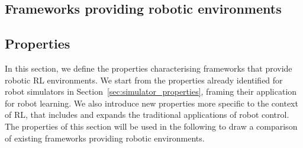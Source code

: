 \begin{addmargin}{-2mm}
\newpage
\section{Frameworks providing robotic environments}

\vspace*{-0.3mm}
\subsection{Properties}

In this section, we define the properties characterising frameworks that provide robotic \ac{RL} environments.
We start from the properties already identified for robot simulators in Section~\ref{sec:simulator_properties}, framing their application for robot learning.
We also introduce new properties more specific to the context of \ac{RL}, that includes and expands the traditional applications of robot control.
The properties of this section will be used in the following to draw a comparison of existing frameworks providing robotic environments.


\end{addmargin}
